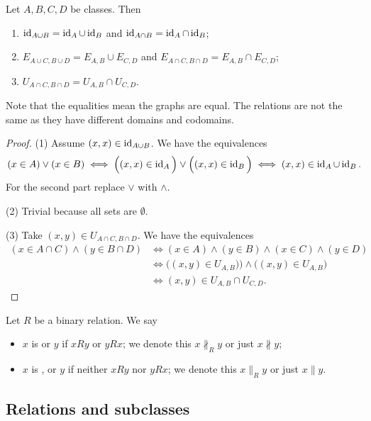 \begin{lemma}
Let $A,B,C,D$ be classes. Then
\begin{enumerate}
\item $\operatorname{id}_{A\cup B} = \operatorname{id}_A\cup \operatorname{id}_B$ and $\operatorname{id}_{A\cap B} = \operatorname{id}_A\cap \operatorname{id}_B$;
\item $E_{A\cup C, B\cup D} = E_{A,B}\cup E_{C,D}$ and $E_{A\cap C, B\cap D} = E_{A,B}\cap E_{C,D}$;
\item $U_{A\cap C, B\cap D} = U_{A,B}\cap U_{C,D}$.
\end{enumerate}
\end{lemma}
Note that the equalities mean the graphs are equal. The relations are not the same as they have different domains and codomains.
\begin{proof}
(1) Assume $(x,x)\in \operatorname{id}_{A\cup B}$. We have the equivalences
\[ (x\in A)\lor (x\in B) \iff \Big((x,x)\in \operatorname{id}_A\Big) \lor \Big((x,x)\in\operatorname{id}_B\Big) \iff (x,x)\in \operatorname{id}_A\cup \operatorname{id}_B. \]
For the second part replace $\lor$ with $\land$.

(2) Trivial because all sets are $\emptyset$.

(3) Take $(x,y)\in U_{A\cap C, B\cap D}$. We have the equivalences
\begin{align*}
(x\in A\cap C) \land (y\in B\cap D) &\iff (x\in A)\land (y\in B)\land(x\in C)\land(y\in D) \\
&\iff \big((x,y)\in U_{A, B})\big)\land\big((x,y)\in U_{A, B}\big) \\
&\iff (x,y)\in U_{A,B}\cap U_{C,D}.
\end{align*}
\end{proof}


\begin{definition}
Let $R$ be a binary relation. We say
\begin{itemize}
\item $x$ is  or  $y$ if $xRy$ or $yRx$; we denote this $x\nparallel_R y$ or just $x\nparallel y$;
\item $x$ is ,  or  $y$ if neither $xRy$ nor $yRx$; we denote this $x\parallel_R y$ or just $x\parallel y$.
\end{itemize}
\end{definition}

\subsection{Relations and subclasses}
